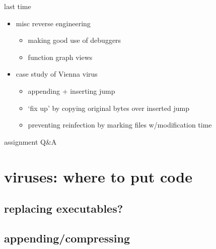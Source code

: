 \date{}
\title{}
\date{}

\begin{frame}
    \titlepage
\end{frame}



\begin{frame}{last time}
    \begin{itemize}
    \item misc reverse engineering
        \begin{itemize}
        \item making good use of debuggers
        \item function graph views
        \end{itemize}
    \item case study of Vienna virus
        \begin{itemize}
        \item appending + inserting jump
        \item `fix up' by copying original bytes over inserted jump
        \item preventing reinfection by marking files w/modification time
        \end{itemize}
    \end{itemize}
\end{frame}

\begin{frame}{assignment Q\&A}
\end{frame}

\section{viruses: where to put code}



\subsection{replacing executables?}




\subsection{appending/compressing}



